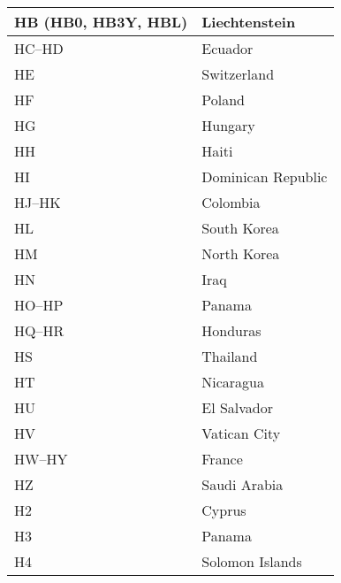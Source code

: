 \begin{longtable}{|l|l|}
  \hline
  HB (HB0, HB3Y, HBL) & Liechtenstein                             \\
  \hline
  HC--HD              & Ecuador                                   \\
  \hline
  HE                  & Switzerland                               \\
  \hline
  HF                  & Poland                                    \\
  \hline
  HG                  & Hungary                                   \\
  \hline
  HH                  & Haiti                                     \\
  \hline
  HI                  & Dominican Republic                        \\
  \hline
  HJ--HK              & Colombia                                  \\
  \hline
  HL                  & South Korea                               \\
  \hline
  HM                  & North Korea                               \\
  \hline
  HN                  & Iraq                                      \\
  \hline
  HO--HP              & Panama                                    \\
  \hline
  HQ--HR              & Honduras                                  \\
  \hline
  HS                  & Thailand                                  \\
  \hline
  HT                  & Nicaragua                                 \\
  \hline
  HU                  & El Salvador                               \\
  \hline
  HV                  & Vatican City                              \\
  \hline
  HW--HY              & France                                    \\
  \hline
  HZ                  & Saudi Arabia                              \\
  \hline
  H2                  & Cyprus                                    \\
  \hline
  H3                  & Panama                                    \\
  \hline
  H4                  & Solomon Islands                           \\
  \hline

\end{longtable}
